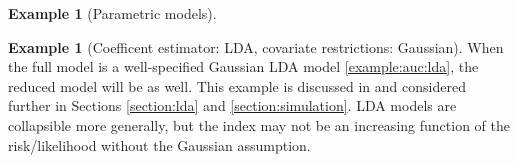\documentclass[12pt]{article}
\theoremstyle{definition}
\newtheorem{example}{Example}%
\newtheorem{subexample}{Example}%
\newcommand{\comment}[1]{
  \iftoggle{commenttoggle}{
    {\normalsize{\color{red}{ #1}}\normalsize}
  }
  {}
}
\begin{document}
\begin{example}[Parametric models]
\begin{subexample} [Coefficent estimator: LDA, covariate restrictions:
  Gaussian] When the full model is a well-specified Gaussian LDA model
  \ref{example:auc:lda}, the reduced model will be as well. This
  example is discussed in \citet{demler2011} \comment{give their
    mahalanobis distance characterization. cite other papers that discuss this model} and considered further in Sections \ref{section:lda} and \ref{section:simulation}. LDA models are collapsible
  more generally, but the index may not be an increasing function of
  the risk/likelihood without the Gaussian assumption.  %
\end{subexample}
\end{example}


\end{document}
